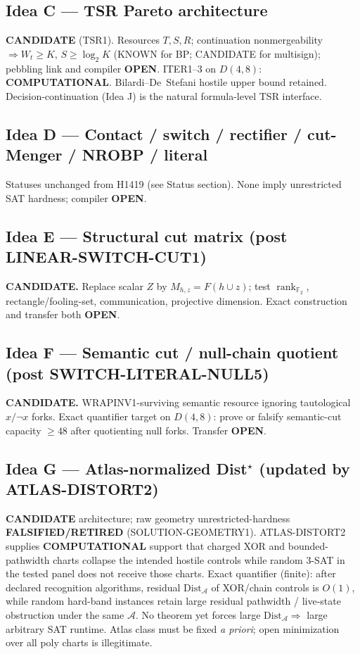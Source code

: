 \documentclass[11pt]{article}
\begin{document}
\subsection*{Idea C --- TSR Pareto architecture}
\textbf{CANDIDATE} (TSR1). Resources $T,S,R$; continuation nonmergeability $\Rightarrow W_t\ge K$,
$S\ge\log_2 K$ (KNOWN for BP; CANDIDATE for multisign); pebbling link and compiler \textbf{OPEN}.
ITER1--3 on $D(4,8)$: \textbf{COMPUTATIONAL}. Bilardi--De~Stefani hostile upper bound retained.
Decision-continuation (Idea J) is the natural formula-level TSR interface.

\subsection*{Idea D --- Contact / switch / rectifier / cut-Menger / NROBP / literal}
Statuses unchanged from H1419 (see Status section). None imply unrestricted SAT hardness;
compiler \textbf{OPEN}.

\subsection*{Idea E --- Structural cut matrix (post LINEAR-SWITCH-CUT1)}
\textbf{CANDIDATE.} Replace scalar $Z$ by $M_{h,z}=F(h\cup z)$; test
$\operatorname{rank}_{\mathbb F_2}$, rectangle/fooling-set, communication, projective dimension.
Exact construction and transfer both \textbf{OPEN}.

\subsection*{Idea F --- Semantic cut / null-chain quotient (post SWITCH-LITERAL-NULL5)}
\textbf{CANDIDATE.} WRAPINV1-surviving semantic resource ignoring tautological $x/\neg x$
forks. Exact quantifier target on $D(4,8)$: prove or falsify semantic-cut capacity $\ge 48$
after quotienting null forks. Transfer \textbf{OPEN}.

\subsection*{Idea G --- Atlas-normalized Dist$^\star$ (updated by ATLAS-DISTORT2)}
\textbf{CANDIDATE} architecture; raw geometry unrestricted-hardness
\textbf{FALSIFIED/RETIRED} (SOLUTION-GEOMETRY1).
ATLAS-DISTORT2 supplies \textbf{COMPUTATIONAL} support that charged XOR and
bounded-pathwidth charts collapse the intended hostile controls while random 3-SAT
in the tested panel does not receive those charts.
Exact quantifier (finite): after declared recognition algorithms, residual
$\mathrm{Dist}_{\mathcal A}$ of XOR/chain controls is $O(1)$, while random hard-band
instances retain large residual pathwidth / live-state obstruction under the same $\mathcal A$.
No theorem yet forces large $\mathrm{Dist}_{\mathcal A}\Rightarrow$ large arbitrary SAT runtime.
Atlas class must be fixed \emph{a priori}; open minimization over all poly charts is illegitimate.
\end{document}
